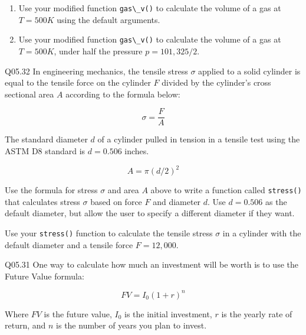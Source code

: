 \documentclass{book}
\newcommand{\passthrough}[1]{#1}
\begin{document}
\begin{enumerate}
\def\labelenumi{(\alph{enumi})}
\item
  Use your modified function \passthrough{\lstinline!gas\_v()!} to
  calculate the volume of a gas at \(T = 500 K\) using the default
  arguments.
\item
  Use your modified function \passthrough{\lstinline!gas\_v()!} to
  calculate the volume of a gas at \(T = 500K\), under half the pressure
  \(p = 101,325/2\).
\end{enumerate}

Q05.32 In engineering mechanics, the tensile stress \(\sigma\) applied
to a solid cylinder is equal to the tensile force on the cylinder \(F\)
divided by the cylinder's cross sectional area \(A\) according to the
formula below:

\[ \sigma = \frac{F}{A} \]

The standard diameter \(d\) of a cylinder pulled in tension in a tensile
test using the ASTM D8 standard is \(d=0.506\) inches.

\[ A = \pi(d/2)^2 \]

Use the formula for stress \(\sigma\) and area \(A\) above to write a
function called \passthrough{\lstinline!stress()!} that calculates
stress \(\sigma\) based on force \(F\) and diameter \(d\). Use
\(d=0.506\) as the default diameter, but allow the user to specify a
different diameter if they want.

Use your \passthrough{\lstinline!stress()!} function to calculate the
tensile stress \(\sigma\) in a cylinder with the default diameter and a
tensile force \(F = 12,000\).

Q05.31 One way to calculate how much an investment will be worth is to
use the Future Value formula:

\[ FV = I_0(1 + r)^n \]

Where \(FV\) is the future value, \(I_0\) is the initial investment,
\(r\) is the yearly rate of return, and \(n\) is the number of years you
plan to invest.
\end{document}
